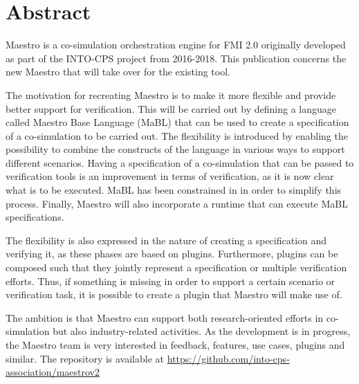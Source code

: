 \documentclass[a4paper,12pt,final]{include/intocpsassociation}   %
\newenvironment{assumption}{\noindent\smallskip\color{blue}\begin{framed}\begin{minipage}{0.95\columnwidth}}{\end{minipage}\end{framed}\smallskip\par}
\begin{document}
\maketitle
%
%
%
\section*{Abstract}
\label{sec:abstract}
%
Maestro is a co-simulation orchestration engine for FMI 2.0 originally developed as part of the INTO-CPS project from 2016-2018. This publication
concerns the new Maestro that will take over for the existing tool.

The motivation for recreating Maestro is to make it more flexible and provide
better support for verification. This will be carried out by defining a language
called Maestro Base Language (MaBL) that can be used to create a specification
of a co-simulation to be carried out. The flexibility is introduced by enabling
the possibility to combine the constructs of the language in various ways to
support different scenarios. Having a specification of a co-simulation that can
be passed to verification tools is an improvement in terms of verification, as
it is now clear what is to be executed. MaBL has been constrained in in order to
simplify this process. Finally, Maestro will also incorporate a runtime that can
execute MaBL specifications.

The flexibility is also expressed in the nature of creating a specification and
verifying it, as these phases are based on plugins. Furthermore, plugins can be composed such
that they jointly represent a specification or multiple verification efforts. Thus, if something is
missing in order to support a certain scenario or verification task, it is
possible to create a plugin that Maestro will make use of.


The ambition is that Maestro can support both research-oriented efforts in
co-simulation but also industry-related activities. As the development is in
progress, the Maestro team is very interested in feedback, features, use cases,
plugins and similar. The repository is available at \url{https://github.com/into-cps-association/maestrov2}
\newpage
%
\tableofcontents
\newpage
%
%
%
%
%
%

\clearpage

\clearpage

\clearpage

\clearpage

\clearpage

\clearpage

\clearpage

\clearpage

\clearpage
%
%
%
%


\label{ch:bib} %
%
%
%
\clearpage
%
%
%
\appendix

\clearpage
%
%
%
\end{document}
